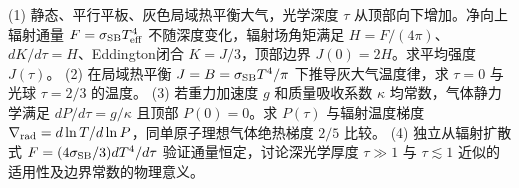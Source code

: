 (1) 静态、平行平板、灰色局域热平衡大气，光学深度 \(\tau\) 从顶部向下增加。净向上辐射通量 \(F=\sigma_{\rm SB}T_{\rm eff}^4\) 不随深度变化，辐射场角矩满足 \(H=F/(4\pi)\)、\(dK/d\tau=H\)、Eddington闭合 \(K=J/3\)，顶部边界 \(J(0)=2H\)。求平均强度 \(J(\tau)\)。
(2) 在局域热平衡 \(J=B=\sigma_{\rm SB}T^4/\pi\) 下推导灰大气温度律，求 \(\tau=0\) 与光球 \(\tau=2/3\) 的温度。
(3) 若重力加速度 \(g\) 和质量吸收系数 \(\kappa\) 均常数，气体静力学满足 \(dP/d\tau=g/\kappa\) 且顶部 \(P(0)=0\)。求 \(P(\tau)\) 与辐射温度梯度 \(\nabla_{\rm rad}=d\ln T/d\ln P\)，同单原子理想气体绝热梯度 \(2/5\) 比较。
(4) 独立从辐射扩散式 \(F=(4\sigma_{\rm SB}/3)dT^4/d\tau\) 验证通量恒定，讨论深光学厚度 \(\tau\gg1\) 与 \(\tau\lesssim1\) 近似的适用性及边界常数的物理意义。
